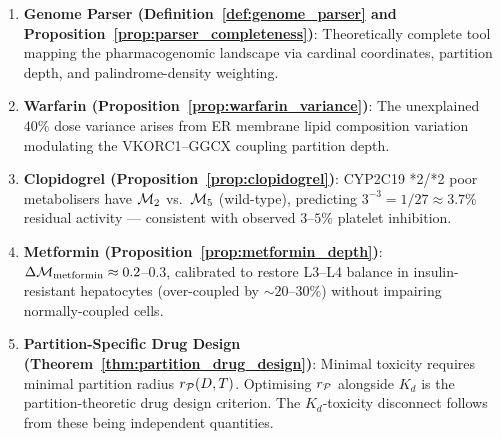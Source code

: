 \begin{chapterbox}[title=Chapter 25 --- Key Results Established]
\begin{enumerate}[label=\textbf{\arabic*.}]
  \item \textbf{Genome Parser (Definition~\ref{def:genome_parser}
        and Proposition~\ref{prop:parser_completeness})}:
        Theoretically complete tool mapping the pharmacogenomic landscape via
        cardinal coordinates, partition depth, and palindrome-density weighting.

  \item \textbf{Warfarin (Proposition~\ref{prop:warfarin_variance})}:
        The unexplained $40\%$ dose variance arises from ER membrane lipid
        composition variation modulating the VKORC1--GGCX coupling partition
        depth.

  \item \textbf{Clopidogrel (Proposition~\ref{prop:clopidogrel})}:
        CYP2C19 *2/*2 poor metabolisers have $\mathcal{M}_2$ vs.\ $\mathcal{M}_5$
        (wild-type), predicting $3^{-3} = 1/27 \approx 3.7\%$ residual
        activity --- consistent with observed $3$--$5\%$ platelet inhibition.

  \item \textbf{Metformin (Proposition~\ref{prop:metformin_depth})}:
        $\Delta\mathcal{M}_{\mathrm{metformin}} \approx 0.2$--$0.3$, calibrated
        to restore L3--L4 balance in insulin-resistant hepatocytes
        (over-coupled by $\sim 20$--$30\%$) without impairing normally-coupled cells.

  \item \textbf{Partition-Specific Drug Design (Theorem~\ref{thm:partition_drug_design})}:
        Minimal toxicity requires minimal partition radius $r_{\mathcal{P}}(D,T)$.
        Optimising $r_{\mathcal{P}}$ alongside $K_d$ is the partition-theoretic drug
        design criterion. The $K_d$-toxicity disconnect follows from these
        being independent quantities.
\end{enumerate}
\end{chapterbox}
